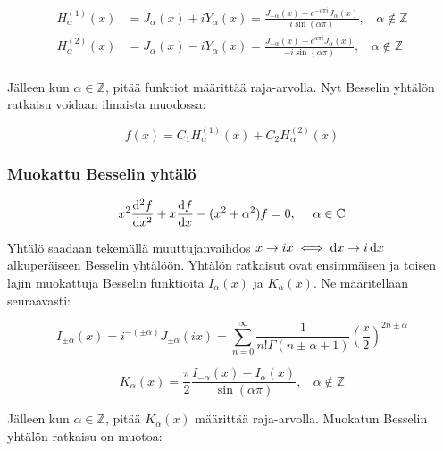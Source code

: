 \documentclass[../johdoksia.tex]{subfiles}
\begin{document}
	\begin{equation}
		\boxed{
			\begin{aligned}
				H^{(1)}_{\alpha}(x) &= J_{\alpha}(x) + iY_{\alpha}(x) = \frac{J_{-\alpha}(x) - e^{-a\pi i}J_{\alpha}(x)}{i\sin(\alpha\pi)}, \ \ \ \ \alpha\notin\mathbb{Z} \\
				H^{(2)}_{\alpha}(x) &= J_{\alpha}(x) - iY_{\alpha}(x) = \frac{J_{-\alpha}(x) - e^{a\pi i}J_{\alpha}(x)}{-i\sin(\alpha\pi)}, \ \ \ \ \alpha\notin\mathbb{Z} \\
		\end{aligned}}
	\end{equation}
	
	Jälleen kun $\alpha\in\mathbb{Z}$, pitää funktiot määrittää raja-arvolla. Nyt Besselin yhtälön ratkaisu voidaan ilmaista muodossa:
	
	\begin{equation}
		\boxed{f(x) = C_1H^{(1)}_{\alpha}(x) + C_2H^{(2)}_{\alpha}(x)}
	\end{equation}
	
	\subsubsection{Muokattu Besselin yhtälö}
	
	\begin{equation}
		x^2\odv{^2f}{x^2} + x\odv{f}{x} - (x^2 + \alpha^2)f = 0, \ \ \ \ \alpha\in\mathbb{C}
	\end{equation}
	
	Yhtälö saadaan tekemällä muuttujanvaihdos $x \to ix \iff \odif{x} \to i\odif{x}$ alkuperäiseen Besselin yhtälöön. Yhtälön ratkaisut ovat ensimmäisen ja toisen lajin muokattuja Besselin funktioita $I_{\alpha}(x)$ ja $K_{\alpha}(x)$. Ne määritellään seuraavasti:
	
	\begin{equation}
		\boxed{I_{\pm\alpha}(x) = i^{-(\pm\alpha)}J_{\pm\alpha}(ix) = \sum_{n = 0}^{\infty}\frac{1}{n!\Gamma(n \pm \alpha + 1)}\left(\frac{x}{2}\right)^{2n \pm \alpha}}
	\end{equation}
	
	\begin{equation}
		\boxed{K_{\alpha}(x) = \frac{\pi}{2}\frac{I_{-\alpha}(x) - I_{\alpha}(x)}{\sin(\alpha\pi)}, \ \ \ \ \alpha\notin\mathbb{Z}}
	\end{equation}
	
	Jälleen kun $\alpha\in\mathbb{Z}$, pitää $K_{\alpha}(x)$ määrittää raja-arvolla. Muokatun Besselin yhtälön ratkaisu on muotoa:
	
\end{document}
